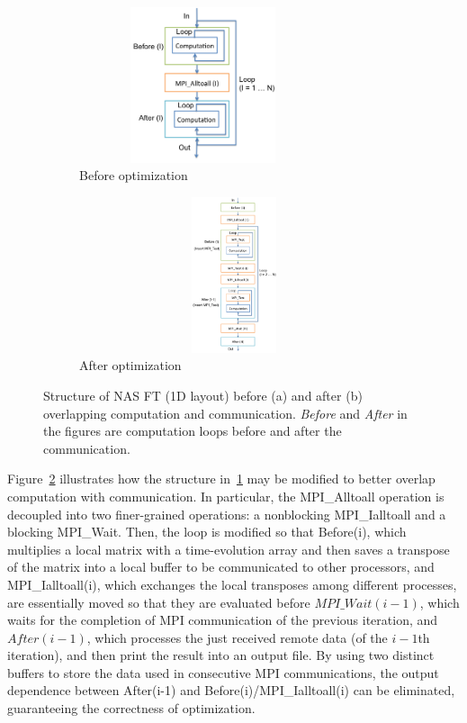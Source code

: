 \begin{figure}
  \centering
  \begin{subfigure}[b]{0.2\textwidth}
    \includegraphics[width=0.8\textwidth,height=1.8in]{fig/ft_loop.png}
    \caption{Before optimization}
    \label{fig:ft_loop}
  \end{subfigure}%
  \hspace{-.3in}
  \begin{subfigure}[b]{0.3\textwidth}
    \includegraphics[width=1.1\textwidth,height=1.8in]{fig/ft_cco.png}
    \caption{After optimization}
    \label{fig:ft_cco}
  \end{subfigure}
  \caption{Structure of NAS FT (1D layout) before (a) and after (b)
    overlapping computation and communication.  \emph{Before} and
    \emph{After} in the figures are computation loops before and after
    the communication.}
\label{fig:ft}
\end{figure}

Figure~\ref{fig:ft_cco} illustrates how the structure
in~\ref{fig:ft_loop} may be modified to better overlap computation
with communication.  In particular, the MPI\_Alltoall operation is
decoupled into two finer-grained operations: a nonblocking
MPI\_Ialltoall and a blocking MPI\_Wait.  Then, the loop is modified
so that Before(i), which multiplies a local matrix with a
time-evolution array and then saves a transpose of the matrix into a
local buffer to be communicated to other processors, and
MPI\_Ialltoall(i), which exchanges the local transposes among different
processes, are essentially moved so that they are evaluated before
$MPI\_Wait(i-1)$, which waits for the completion of MPI communication
of the previous iteration, and $After(i-1)$, which processes the just
received remote data (of the $i-1$th iteration), and then print the
result into an output file.  By using two distinct buffers to store
the data used in consecutive MPI communications, the output
dependence between After(i-1) and Before(i)/MPI\_Ialltoall(i) can be
eliminated, guaranteeing the correctness of optimization.

